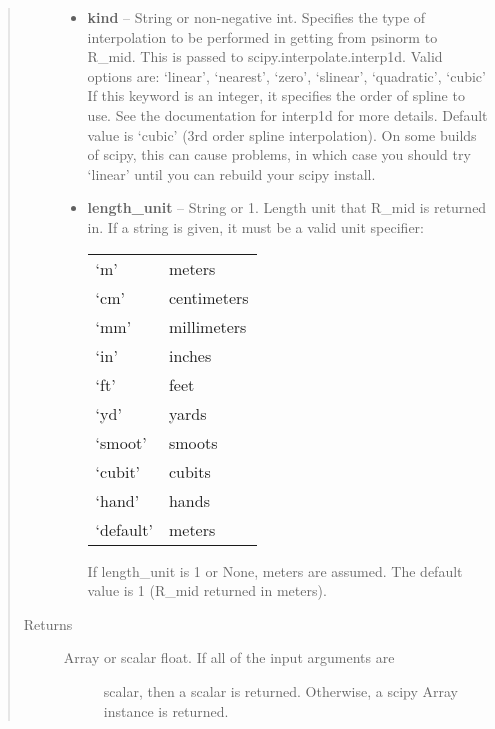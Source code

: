 \documentclass[letterpaper,10pt,english]{sphinxmanual}
\begin{document}
\begin{fulllineitems}
\begin{fulllineitems}
\begin{quote}
\begin{description}
\begin{itemize}
\item {} 
\textbf{kind} -- String or non-negative int.
Specifies the type of interpolation
to be performed in getting from psinorm to R\_mid. This is
passed to scipy.interpolate.interp1d. Valid options are:
`linear', `nearest', `zero', `slinear', `quadratic', `cubic'
If this keyword is an integer, it specifies the order of spline
to use. See the documentation for interp1d for more details.
Default value is `cubic' (3rd order spline interpolation). On
some builds of scipy, this can cause problems, in which case
you should try `linear' until you can rebuild your scipy install.

\item {} 
\textbf{length\_unit} -- 
String or 1.
Length unit that R\_mid is returned in. If
a string is given, it must be a valid unit specifier:

\begin{tabulary}{\linewidth}{|L|L|}
\hline

`m'
 & 
meters
\\

`cm'
 & 
centimeters
\\

`mm'
 & 
millimeters
\\

`in'
 & 
inches
\\

`ft'
 & 
feet
\\

`yd'
 & 
yards
\\

`smoot'
 & 
smoots
\\

`cubit'
 & 
cubits
\\

`hand'
 & 
hands
\\

`default'
 & 
meters
\\
\hline\end{tabulary}


If length\_unit is 1 or None, meters are assumed. The default
value is 1 (R\_mid returned in meters).


\end{itemize}

\item[{Returns}] \leavevmode
\begin{description}
\item[{Array or scalar float. If all of the input arguments are}] \leavevmode
scalar, then a scalar is returned. Otherwise, a scipy Array
instance is returned.


\end{description}
\end{description}
\end{quote}
\end{fulllineitems}
\end{fulllineitems}
\end{document}
